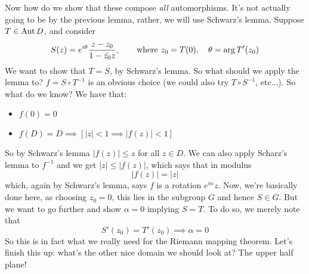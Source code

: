 \documentclass{article}
\begin{document}
Now how do we show that these compose \textit{all} automorphisms. It's not actually going to be by the previous lemma, rather, we will use Schwarz's lemma. Suppose \(T \in \operatorname{Aut} D\), and consider
\begin{equation}S(z) = e^{i\theta}\frac{z - z_0}{1 - \bar{z_0}z}, \qquad \text{where} \ z_0 = T(0), \quad \theta = \operatorname{arg} T'(z_0)\end{equation}
We want to show that \(T = S\), by Schwarz's lemma. So what should we apply the lemma to? \(f = S \circ T^{-1}\) is an obvious choice (we could also try \(T \circ S^{-1}\), etc...). So what do we know? We have that:
\begin{itemize}

  \item \(f(0) = 0\)

  \item \(f(D) = D \implies [|z| < 1 \implies |f(z)| < 1]\)

\end{itemize}
So by Schwarz's lemma \(|f(z)| \leq z\) for all \(z \in D\). We can also apply Scharz's lemma to \(f^{-1}\) and we get \(|z| \leq |f(z)|\), which says that in modulus
\begin{equation}|f(z)| = |z|\end{equation}
which, again by Schwarz's lemma, says \(f\) is a rotation \(e^{i\alpha}z\). Now, we're basically done here, as choosing \(z_0 = 0\), this lies in the subgroup \(G\) and hence \(S \in G\). But we want to go further and show \(\alpha = 0\) implying \(S = T\). To do so, we merely note that
\begin{equation}S'(z_0) = T'(z_0) \implies \alpha = 0\end{equation}
So this is in fact what we really need for the Riemann mapping theorem. Let's finish this up: what's the other nice domain we should look at? The upper half plane!
\end{document}

